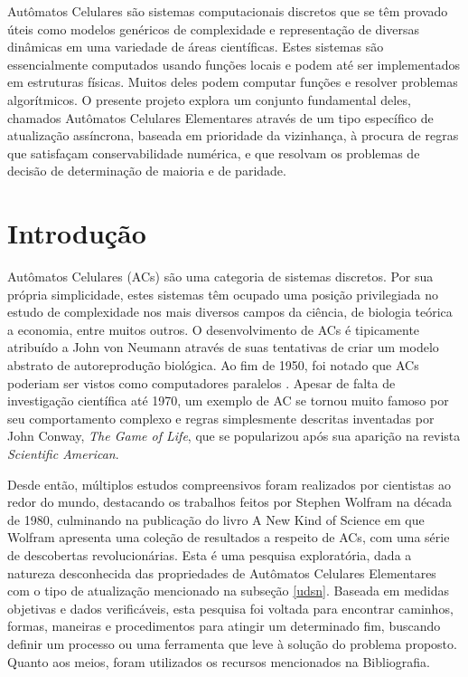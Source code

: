 \documentclass[a4paper,12pt]{ltxdoc}
\newcommand\tab[1][1cm]{\hspace*{#1}}
\begin{document}
\begin{resumo}
  Autômatos Celulares são sistemas computacionais discretos que se têm provado úteis como modelos genéricos de complexidade e representação de diversas dinâmicas em uma variedade de áreas científicas. Estes sistemas são essencialmente computados usando funções locais e podem até ser implementados em estruturas físicas. Muitos deles podem computar funções e resolver problemas algorítmicos. O presente projeto explora um conjunto fundamental deles, chamados Autômatos Celulares Elementares através de um tipo específico de atualização assíncrona, baseada em prioridade da vizinhança, à procura de regras que satisfaçam conservabilidade numérica, e que resolvam os problemas de decisão de determinação de maioria e de paridade.

\end{resumo}

\renewcommand{\contentsname}{\centerline{\Large Sumário}}

\section{Introdução}

Autômatos Celulares (ACs) são uma categoria de sistemas discretos. Por sua própria simplicidade, estes sistemas têm ocupado uma posição privilegiada no estudo de complexidade nos mais diversos campos da ciência, de biologia teórica a economia, entre muitos outros. O desenvolvimento de ACs é tipicamente atribuído a John von Neumann através de suas tentativas de criar um modelo abstrato de autoreprodução biológica. Ao fim de 1950, foi notado que ACs poderiam ser vistos como computadores paralelos \cite[p. 876]{wolfram2002new}. Apesar de falta de investigação científica até 1970, um exemplo de AC se tornou muito famoso por seu comportamento complexo e regras simplesmente descritas inventadas por John Conway, \textit{The Game of Life}, que se popularizou após sua aparição na revista \textit{Scientific American}. 

\tab Desde então, múltiplos estudos compreensivos foram realizados por cientistas ao redor do mundo, destacando os trabalhos feitos por Stephen Wolfram na década de 1980, culminando na publicação do livro A New Kind of Science em que Wolfram apresenta uma coleção de resultados a respeito de ACs, com uma série de descobertas revolucionárias.  
Esta é uma pesquisa exploratória, dada a natureza desconhecida das propriedades de Autômatos Celulares Elementares com o tipo de atualização mencionado na subseção \ref{udsn}. Baseada em medidas objetivas e dados verificáveis, esta pesquisa foi voltada para encontrar caminhos, formas, maneiras e procedimentos para atingir um determinado fim, buscando definir um processo ou uma ferramenta que leve à solução do problema proposto. Quanto aos meios, foram utilizados os recursos mencionados na Bibliografia.
\end{document}
